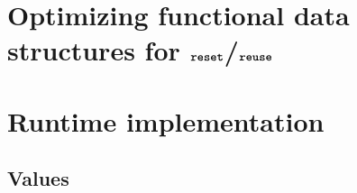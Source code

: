 \documentclass[sigconf]{acmart}
\begin{document}

\section{Optimizing functional data structures for $\texttt{\textbf{reset}}$/$\texttt{\textbf{reuse}}$}
\label{sec:reuse}



\section{Runtime implementation}
\label{sec:runtime}


\subsection{Values}
\end{document}

